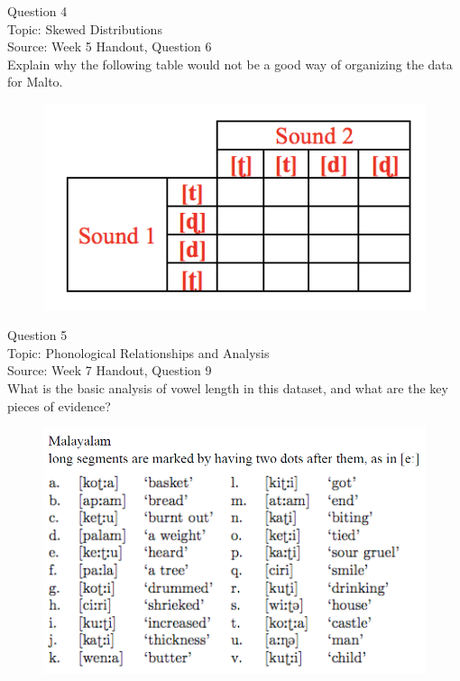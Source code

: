 \documentclass[12pt]{article}
\begin{document}
\newpage

{\large Question 4}\\

Topic: Skewed Distributions\\
Source: Week 5 Handout, Question 6\\

Explain why the following table would not be a good way of organizing the data for Malto.\\

\begin{figure}[H]
\includegraphics{../images/Malto_table_bad.png}
\end{figure}

\newpage

{\large Question 5}\\

Topic: Phonological Relationships and Analysis\\
Source: Week 7 Handout, Question 9\\

What is the basic analysis of vowel length in this dataset, and what are the key pieces of evidence?\\

\begin{figure}[H]
\includegraphics{../images/malayalam.png}
\end{figure}
\end{document}
